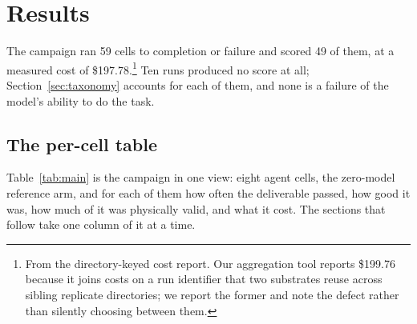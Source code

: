\section{Results}
\label{sec:results}

The campaign ran 59 cells to completion or failure and scored 49 of them, at a
measured cost of \$197.78.\footnote{From the directory-keyed cost report. Our
aggregation tool reports \$199.76 because it joins costs on a run identifier
that two substrates reuse across sibling replicate directories; we report the
former and note the defect rather than silently choosing between them.} Ten
runs produced no score at all; Section~\ref{sec:taxonomy} accounts for each of
them, and none is a failure of the model's ability to do the task.

\subsection{The per-cell table}
\label{sec:main-table}

Table~\ref{tab:main} is the campaign in one view: eight agent cells, the
zero-model reference arm, and for each of them how often the deliverable
passed, how good it was, how much of it was physically valid, and what it
cost. The sections that follow take one column of it at a time.

